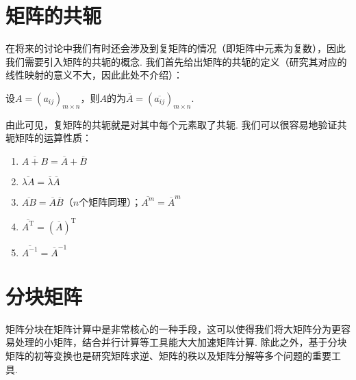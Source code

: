 \section{矩阵的共轭}

在将来的讨论中我们有时还会涉及到复矩阵的情况（即矩阵中元素为复数），因此我们需要引入矩阵的共轭的概念. 我们首先给出矩阵的共轭的定义（研究其对应的线性映射的意义不大，因此此处不介绍）：
\begin{definition}{}{}
    设$A=(a_{ij})_{m \times n}$，则$A$的为$\overline{A}=(\overline{a_{ij}})_{m \times n}$.
\end{definition}

由此可见，复矩阵的共轭就是对其中每个元素取了共轭. 我们可以很容易地验证共轭矩阵的运算性质：
\begin{enumerate}
    \item $\overline{A+B}=\overline{A}+\overline{B}$

    \item $\overline{\lambda A}=\overline{\lambda}\overline{A}$

    \item $\overline{AB}=\overline{A}\overline{B}$（$n$个矩阵同理）；$\overline{A^m}=\overline{A}^m$

    \item $\overline{A^\mathrm{T}}=(\overline{A})^\mathrm{T}$

    \item $\overline{A^{-1}}=\overline{A}^{-1}$
\end{enumerate}

\section{分块矩阵}

矩阵分块在矩阵计算中是非常核心的一种手段，这可以使得我们将大矩阵分为更容易处理的小矩阵，结合并行计算等工具能大大加速矩阵计算. 除此之外，基于分块矩阵的初等变换也是研究矩阵求逆、矩阵的秩以及矩阵分解等多个问题的重要工具.

